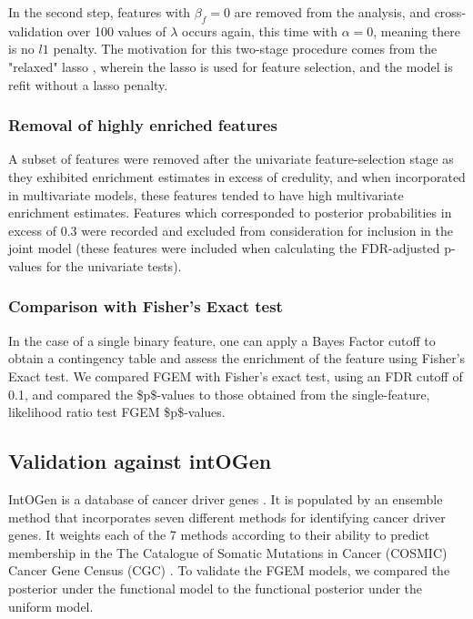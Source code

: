 In the second step, features with \(\beta_f=0\) are removed from the analysis, and cross-validation over 100 values of \(\lambda\) occurs again, this time with \(\alpha = 0\), meaning there is no \(l1\) penalty.  The motivation for this two-stage
procedure comes from the "relaxed" lasso \cite{hastie17_exten_compar_best_subset_selec}, wherein the lasso is used for feature selection, and the model is refit without a lasso penalty.  

\subsubsection{Removal of highly enriched features}\label{sec:org02cff25}

    A subset of features were removed after the univariate feature-selection stage as they exhibited enrichment estimates in excess of credulity, and when incorporated in multivariate models, these features tended to have high multivariate enrichment estimates. Features which corresponded to posterior probabilities in excess of 0.3 were recorded and excluded from consideration for inclusion in the joint model (these features were included when calculating the FDR-adjusted p-values for the univariate tests).  

\subsubsection{Comparison with Fisher's Exact test}\label{sec:orge6f1632}

In the case of a single binary feature, one can apply a Bayes Factor cutoff to obtain a contingency table and assess the enrichment of the feature using Fisher's Exact test.
We compared FGEM with Fisher's exact test, using an FDR cutoff of 0.1, and compared the \$p\$-values to those obtained from the single-feature, likelihood ratio test FGEM \$p\$-values.

\subsection{Validation against intOGen}\label{sec:orgd8b4e10}

IntOGen is a database of cancer driver genes \cite{gonzalez-perez13_intog_mutat_ident_cancer_driver}.  It is populated by an ensemble method that incorporates seven different methods for identifying cancer driver genes.  
It weights each of the 7 methods according to their ability to predict membership in the The Catalogue of Somatic Mutations in Cancer (COSMIC) Cancer Gene Census (CGC) \cite{COSMIC}.
To validate the FGEM models, we compared the posterior under the functional model to the functional posterior under the uniform model.

